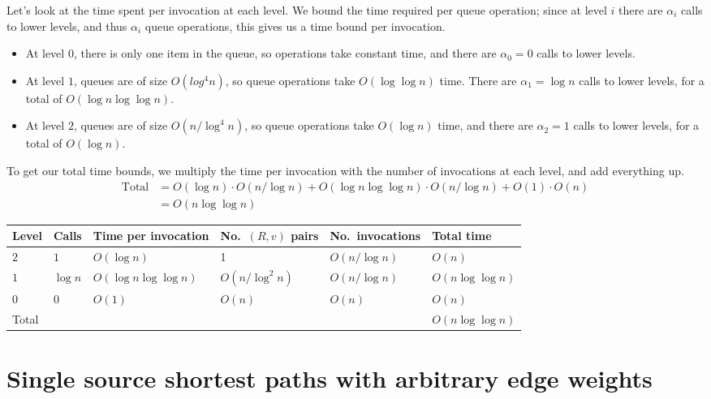 \documentclass[12pt]{article}
\newcommand{\ra}[1]{\renewcommand{\arraystretch}{#1}}
\begin{document}
Let's look at the time spent per invocation at each level. We bound the time required per queue operation; since at level $i$ there are $\alpha_i$ calls to lower levels, and thus $\alpha_i$ queue operations, this gives us a time bound per invocation.

\begin{itemize}
\item At level $0$, there is only one item in the queue, so operations take constant time, and there are $\alpha_0 = 0$ calls to lower levels.
\item At level $1$, queues are of size $O(log^4 n)$, so queue operations take $O(\log \log n)$ time. There are $\alpha_1 = \log n$ calls to lower levels, for a total of $O(\log n \log \log n)$.
\item At level $2$, queues are of size $O(n/\log^4 n)$, so queue operations take $O(\log n)$ time, and there are $\alpha_2 = 1$ calls to lower levels, for a total of $O(\log n)$.
\end{itemize}

To get our total time bounds, we multiply the time per invocation with the number of invocations at each level, and add everything up.
\begin{align*}
  \text{Total} &= O(\log n) \cdot O(n/\log n) + O(\log n \log \log n) \cdot O(n/ \log n) + O(1) \cdot O(n) \\
               &= O(n \log \log n)
\end{align*}


\begin{table*}[!h]\centering
\ra{1.3}
\begin{tabular}{@{}llllll@{}} \toprule
  Level & Calls & Time per invocation & No.\ $(R,v)$ pairs & No.\ invocations & Total time\\ \midrule
  $2$ & $1$ & $O(\log n)$ & 1 & $O(n/\log n)$ & $O(n)$\\
  $1$ & $\log n$ & $O(\log n \log \log n)$ & $O(n/\log^2 n)$ & $O(n/\log n)$ & $O(n\log \log n)$\\
  $0$ & $0$ & $O(1)$ & $O(n)$ & $O(n)$ & $O(n)$\\ \midrule
  Total & & & & & $O(n\log \log n)$\\
  \bottomrule
\end{tabular}
\end{table*}

\section{Single source shortest paths with arbitrary edge weights}
\label{sec:arbitr-edge-weights}




\end{document}
